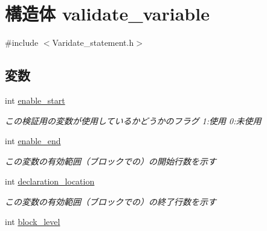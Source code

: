 \hypertarget{structvalidate__variable}{
\section{構造体 validate\_\-variable}
\label{structvalidate__variable}
}


{\ttfamily \#include $<$Varidate\_\-statement.h$>$}

\subsection*{変数}
\begin{DoxyCompactItemize}
\item 
\hypertarget{structvalidate__variable_a5c45828cb643023cfd27baff775c0acf}{
int \hyperlink{structvalidate__variable_a5c45828cb643023cfd27baff775c0acf}{enable\_\-start}}
\label{structvalidate__variable_a5c45828cb643023cfd27baff775c0acf}

\begin{DoxyCompactList}\small\item\em この検証用の変数が使用しているかどうかのフラグ 1:使用 0:未使用 \item\end{DoxyCompactList}\item 
\hypertarget{structvalidate__variable_a95b3e1941730e028e9c2878f93656dc3}{
int \hyperlink{structvalidate__variable_a95b3e1941730e028e9c2878f93656dc3}{enable\_\-end}}
\label{structvalidate__variable_a95b3e1941730e028e9c2878f93656dc3}

\begin{DoxyCompactList}\small\item\em この変数の有効範囲（ブロックでの）の開始行数を示す \item\end{DoxyCompactList}\item 
\hypertarget{structvalidate__variable_aa13526c1c33b126cf8a5da5c96cdfeef}{
int \hyperlink{structvalidate__variable_aa13526c1c33b126cf8a5da5c96cdfeef}{declaration\_\-location}}
\label{structvalidate__variable_aa13526c1c33b126cf8a5da5c96cdfeef}

\begin{DoxyCompactList}\small\item\em この変数の有効範囲（ブロックでの）の終了行数を示す \item\end{DoxyCompactList}\item 
\hypertarget{structvalidate__variable_a92692a6ba8c228191546f6d99082f829}{
int \hyperlink{structvalidate__variable_a92692a6ba8c228191546f6d99082f829}{block\_\-level}}
\label{structvalidate__variable_a92692a6ba8c228191546f6d99082f829}


\end{DoxyCompactItemize}
